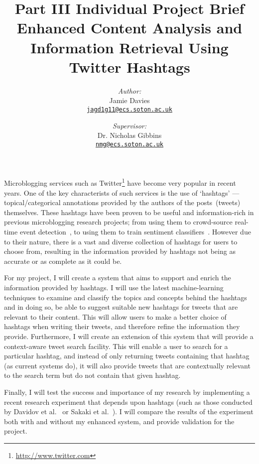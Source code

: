 \documentclass[a4paper,12pt]{article}
\title{
    \Large{Part III Individual Project Brief}\\[0.5cm]
    \huge{Enhanced Content Analysis and Information Retrieval Using Twitter Hashtags}
}
\date{\vspace{-5ex}}
\author{
    \emph{Author:}\\
    Jamie Davies\\
    \href{mailto:jagd1g11@ecs.soton.ac.uk}{\nolinkurl{jagd1g11@ecs.soton.ac.uk}}
    \and
    \emph{Supervisor:}\\
    Dr. Nicholas Gibbins\\
    \href{mailto:nmg@ecs.soton.ac.uk}{\nolinkurl{nmg@ecs.soton.ac.uk}}
}
\begin{document}

\maketitle
\vspace*{0.5cm}

Microblogging services such as Twitter\footnote{\url{http://www.twitter.com}} have become very popular in recent years. One of the key characterists of such services is the use of `hashtags' --- topical/categorical annotations provided by the authors of the posts~(tweets) themselves. These hashtags have been proven to be useful and information-rich in previous microblogging research projects; from using them to crowd-source real-time event detection~\cite{Sakaki:2010}, to using them to train sentiment classifiers~\cite{Davidov:2010}. However due to their nature, there is a vast and diverse collection of hashtags for users to choose from, resulting in the information provided by hashtags not being as accurate or as complete as it could be.

For my project, I will create a system that aims to support and enrich the information provided by hashtags. I will use the latest machine-learning techniques to examine and classify the topics and concepts behind the hashtags and in doing so, be able to suggest suitable new hashtags for tweets that are relevant to their content. This will allow users to make a better choice of hashtags when writing their tweets, and therefore refine the information they provide. Furthermore, I will create an extension of this system that will provide a context-aware tweet search facility. This will enable a user to search for a particular hashtag, and instead of only returning tweets containing that hashtag (as current systems do), it will also provide tweets that are contextually relevant to the search term but do not contain that given hashtag.

Finally, I will test the success and importance of my research by implementing a recent research experiment that depends upon hashtags (such as those conducted by Davidov et al.~\cite{Davidov:2010} or Sakaki et al.~\cite{Sakaki:2010}). I will compare the results of the experiment both with and without my enhanced system, and provide validation for the project.


{\footnotesize }
\end{document}
